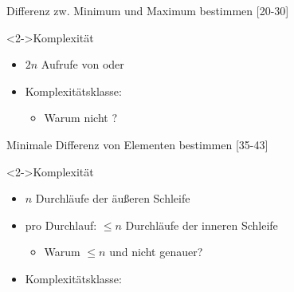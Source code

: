 \begin{frame}
    \begin{exblock}{Differenz zw. Minimum und Maximum bestimmen}
        [20-30]
    \end{exblock}
    \begin{block}<2->{Komplexität}
        \begin{itemize}
            \item $2n$ Aufrufe von  oder 
            \item Komplexitätsklasse: \olin
            \begin{itemize}
                \item \alert{Warum nicht ?}
            \end{itemize}
        \end{itemize}
    \end{block}
\end{frame}

\begin{frame}
    \begin{exblock}{Minimale Differenz von Elementen bestimmen}
        [35-43]
    \end{exblock}
    \begin{block}<2->{Komplexität}
        \begin{itemize}
            \item $n$ Durchläufe der äußeren Schleife
            \item pro Durchlauf: $\leq n$ Durchläufe der inneren Schleife
            \begin{itemize}
                \item \alert{Warum $\leq n$ und nicht genauer?}
            \end{itemize}
            \item Komplexitätsklasse: \osquare
        \end{itemize}
    \end{block}
\end{frame}

